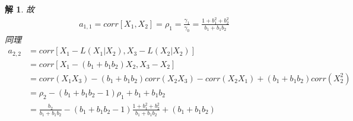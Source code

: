 \documentclass[11pt,a4paper]{ctexart}
\newtheorem*{solution}{解}
\begin{document}
\begin{enumerate}
\begin{solution}
故
\begin{equation}
	\begin{aligned}
		a_{1,1}=corr[X_1,X_2]=\rho_1=\frac{\gamma_1}{\gamma_0}=\frac{1+b_1^2+b_2^2}{b_1+b_1b_2}
	\end{aligned} 
\end{equation}
同理
\begin{equation}
	\begin{aligned}
		a_{2,2}
		&=corr[X_1-L(X_1|X_2),X_3-L(X_2|X_2)]\\
		&=corr[X_1-(b_1+b_1b_2)X_2,X_3-X_2]\\
		&=corr(X_1X_3)-(b_1+b_1b_2)corr(X_2X_3)-corr(X_2X_1)+(b_1+b_1b_2)corr(X_2^2)\\
		&=\rho_2-(b_1+b_1b_2-1)\rho_1+b_1+b_1b_2\\
		&=\frac{b_2}{b_1+b_1b_2}-(b_1+b_1b_2-1)\frac{1+b_1^2+b_2^2}{b_1+b_1b_2}+(b_1+b_1b_2)\\
	\end{aligned} 
\end{equation}


\end{solution}
\end{enumerate}
\end{document}

